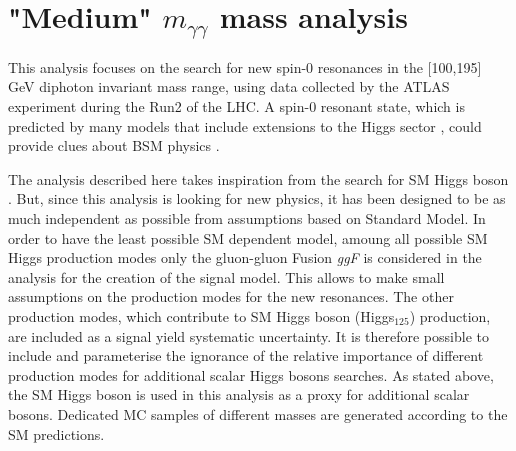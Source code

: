 \documentclass[a4paper, oneside, 11pt, openright]{book}
\begin{document}
 	\chapter{"Medium" $m_{\gamma\gamma}$ mass analysis}\label{chapter:4}
 		This analysis focuses on the search for new spin-0 resonances in the [100,195] GeV diphoton invariant mass range, using data collected by the ATLAS experiment during the Run2 of the LHC. A spin-0 resonant state, which is predicted by many models that include extensions to the Higgs sector \cite{BSM}, could provide clues about BSM physics \cite{Branco_2012,dine_2016}. 	
 		
 		The analysis described here takes inspiration from the search for SM Higgs boson \cite{higgs_atlas}. But, since this analysis is looking for new physics, it has been designed to be as much independent as possible from assumptions based on Standard Model. In order to have the least possible SM dependent model, amoung all possible SM Higgs production modes only the gluon-gluon Fusion \textit{ggF} is considered in the analysis for the creation of the signal model. This allows to make small assumptions on the production modes for the new resonances. The other production modes, which contribute to SM Higgs boson (Higgs$_{125}$) production, are included as a signal yield systematic uncertainty. It is therefore possible to include and parameterise the ignorance of the relative importance of different production modes for additional scalar Higgs bosons searches. As stated above, the SM Higgs boson is used in this analysis as a proxy for additional scalar bosons. Dedicated MC samples of different masses are generated according to the SM predictions.
 		
\end{document}
